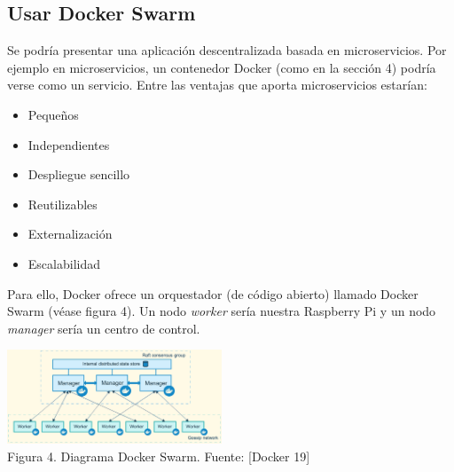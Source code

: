 \documentclass[12pt]{amsart}
\begin{document}
\begin{multicols}{2}
\subsection{Usar Docker Swarm} \label{ch:dockerswarm}
Se podría presentar una aplicación descentralizada basada en microservicios. Por ejemplo en microservicios, un contenedor Docker (como en la sección 4) podría verse como un servicio. Entre las ventajas que aporta microservicios estarían:
\begin{itemize}
 \item Pequeños
 \item Independientes
 \item Despliegue sencillo
 \item Reutilizables
 \item Externalización
 \item Escalabilidad
 \newline
\end{itemize}
Para ello, Docker ofrece un orquestador (de código abierto) llamado Docker Swarm (véase figura 4). Un nodo \textit{worker} sería nuestra Raspberry Pi y un nodo \textit{manager} sería un centro de control.
\begin{center}
  \includegraphics[keepaspectratio, width=0.481125\textwidth]{images/swarm-diagram-sourcedocker.eps}
\\
Figura 4. Diagrama Docker Swarm. Fuente: [Docker 19]
\\
\end{center}

\end{multicols}
\end{document}
